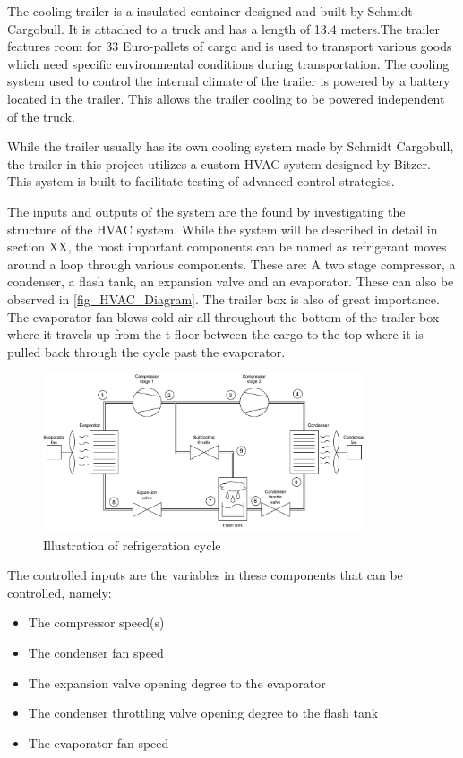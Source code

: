 The cooling trailer is a insulated container designed and built by Schmidt Cargobull. It is attached to a truck and has a length of 13.4 meters.The trailer features room for 33 Euro-pallets of cargo and is used to transport various goods which need specific environmental conditions during transportation. The cooling system used to control the internal climate of the trailer is powered by a battery located in the trailer. This allows the trailer cooling to be powered independent of the truck.

While the trailer usually has its own cooling system made by Schmidt Cargobull, the trailer in this project utilizes a custom HVAC system designed by Bitzer. This system is built to facilitate testing of advanced control strategies.

The inputs and outputs of the system are the found by investigating the structure of the HVAC system. While the system will be described in detail in section XX, the most important components can be named as refrigerant moves around a loop through various components. These are: A two stage compressor, a condenser, a flash tank, an expansion valve and an evaporator. These can also be observed in \cref{fig_HVAC_Diagram}. The trailer box is also of great importance. The evaporator fan blows cold air all throughout the bottom of the trailer box where it travels up from the t-floor between the cargo to the top where it is pulled back through the cycle past the evaporator.

\begin{figure}[h!]
	\centering
	\includegraphics[width=0.85\textwidth]{Graphics/HVAC_Diagram_Fans.pdf}
	\caption{Illustration of refrigeration cycle}
	\label{fig:HVAC_Diagram}
\end{figure}

The controlled inputs are the variables in these components that can be controlled, namely:

\begin{itemize}
	\item The compressor speed(s)
	\item The condenser fan speed
	\item The expansion valve opening degree to the evaporator
	\item The condenser throttling valve opening degree to the flash tank
	\item The evaporator fan speed
\end{itemize}

